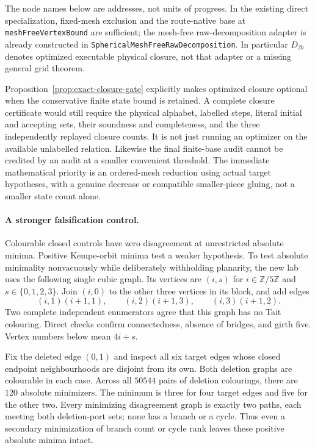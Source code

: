 The node names below are addresses, not units of progress.  In the existing
direct specialization, fixed-mesh exclusion and the
route-native base at \texttt{meshFreeVertexBound} are sufficient; the
mesh-free raw-decomposition adapter is already constructed in
\texttt{SphericalMeshFreeRawDecomposition}. In particular $D_{2b}$ denotes
optimized executable physical closure, not that adapter or a missing
general grid theorem.

Proposition~\ref{prop:exact-closure-gate} explicitly makes optimized closure
optional when the conservative finite state bound is retained. A complete
closure certificate would still require the physical alphabet, labelled steps,
literal initial and accepting sets, their soundness and completeness, and
the three independently replayed closure counts. It is not just running
an optimizer on the available unlabelled relation. Likewise the final
finite-base audit cannot be credited by an audit at a smaller convenient
threshold. The immediate mathematical priority is an ordered-mesh
reduction using actual target hypotheses, with a genuine decrease or
compatible smaller-piece gluing, not a smaller state count alone.

\paragraph{A stronger falsification control.}
Colourable closed controls have zero disagreement at unrestricted absolute
minima. Positive Kempe-orbit minima test a weaker hypothesis. To test
absolute minimality nonvacuously while deliberately withholding planarity,
the new lab uses the following single cubic graph. Its vertices are
$(i,s)$ for $i\in\mathbb Z/5\mathbb Z$ and $s\in\{0,1,2,3\}$.
Join $(i,0)$ to the other three vertices in its block, and add edges
\[
 (i,1)(i+1,1),\qquad (i,2)(i+1,3),\qquad (i,3)(i+1,2).
\]
Two complete independent enumerators agree that this graph has no Tait
colouring. Direct checks confirm connectedness, absence of bridges, and
girth five. Vertex numbers below mean $4i+s$.

Fix the deleted edge $(0,1)$ and inspect all six target edges whose closed
endpoint neighbourhoods are disjoint from its own. Both deletion graphs
are colourable in each case. Across all $50544$ pairs of deletion
colourings, there are $120$ absolute minimizers. The minimum is three for
four target edges and five for the other two. Every minimizing
disagreement graph is exactly two paths, each meeting both deletion-port
sets; none has a branch or a cycle. Thus even a secondary minimization of
branch count or cycle rank leaves these positive absolute minima intact.

